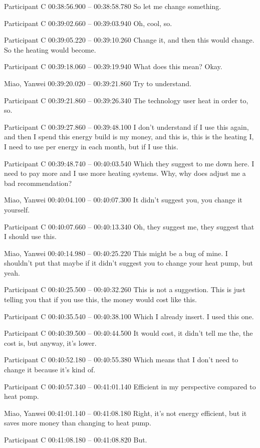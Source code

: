 {Participant C 00:38:56.900 -- 00:38:58.780
So let me change something.

Participant C 00:39:02.660 -- 00:39:03.940
Oh, cool, so.

Participant C 00:39:05.220 -- 00:39:10.260
Change it, and then this would change. So the heating would become.

Participant C 00:39:18.060 -- 00:39:19.940
What does this mean? Okay.

Miao, Yanwei 00:39:20.020 -- 00:39:21.860
Try to understand.

Participant C 00:39:21.860 -- 00:39:26.340
The technology user heat in order to, so.

Participant C 00:39:27.860 -- 00:39:48.100
I don't understand if I use this again, and then I spend this energy build is my money, and this is, this is the heating I, I need to use per energy in each month, but if I use this.

Participant C 00:39:48.740 -- 00:40:03.540
Which they suggest to me down here. I need to pay more and I use more heating systems. Why, why does adjust me a bad recommendation?

Miao, Yanwei 00:40:04.100 -- 00:40:07.300
It didn't suggest you, you change it yourself.

Participant C 00:40:07.660 -- 00:40:13.340
Oh, they suggest me, they suggest that I should use this.

Miao, Yanwei 00:40:14.980 -- 00:40:25.220
This might be a bug of mine. I shouldn't put that maybe if it didn't suggest you to change your heat pump, but yeah.

Participant C 00:40:25.500 -- 00:40:32.260
This is not a suggestion. This is just telling you that if you use this, the money would cost like this.

Participant C 00:40:35.540 -- 00:40:38.100
Which I already insert. I used this one.

Participant C 00:40:39.500 -- 00:40:44.500
It would cost, it didn't tell me the, the cost is, but anyway, it's lower.

Participant C 00:40:52.180 -- 00:40:55.380
Which means that I don't need to change it because it's kind of.

Participant C 00:40:57.340 -- 00:41:01.140
Efficient in my perspective compared to heat pomp.

Miao, Yanwei 00:41:01.140 -- 00:41:08.180
Right, it's not energy efficient, but it saves more money than changing to heat pump.

Participant C 00:41:08.180 -- 00:41:08.820
But.

}
